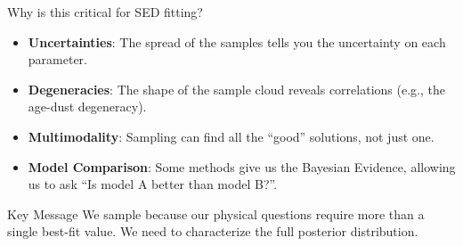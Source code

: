 \documentclass[aspectratio=169]{beamer}
\newcommand{\keyterm}[1]{\textbf{\textcolor{C0}{#1}}}
\begin{document}
\begin{frame}
    \begin{block}{Why is this critical for SED fitting?}
        \begin{itemize}
            \item \keyterm{Uncertainties}: The spread of the samples tells you the uncertainty on each parameter.
            \item \keyterm{Degeneracies}: The shape of the sample cloud reveals correlations (e.g., the age-dust degeneracy).
            \item \keyterm{Multimodality}: Sampling can find all the ``good'' solutions, not just one.
            \item \keyterm{Model Comparison}: Some methods give us the Bayesian Evidence, allowing us to ask ``Is model A better than model B?''.
        \end{itemize}
    \end{block}
    
    \begin{alertblock}{Key Message}
        We sample because our physical questions require more than a single best-fit value. We need to characterize the full posterior distribution.
    \end{alertblock}
\end{frame}
\end{document}
